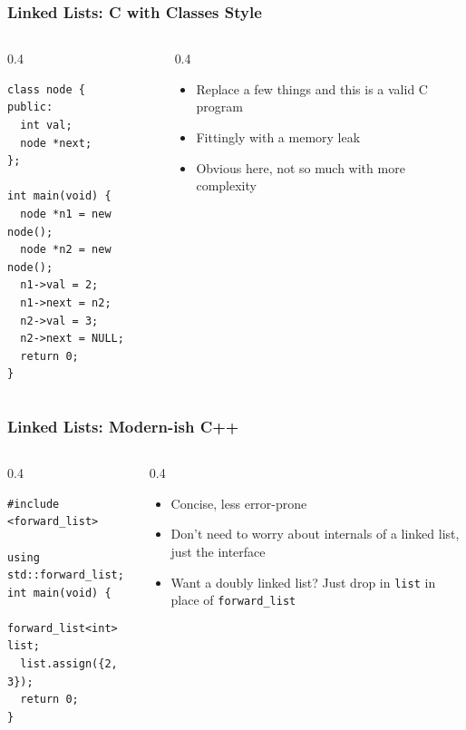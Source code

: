\documentclass{beamer} \usetheme{Madrid}
\begin{document}
\begin{frame}[fragile]
	\frametitle{Linked Lists: C with Classes Style}
	\begin{columns}
		\begin{column}{{0.4\textwidth}}
			\begin{verbatim}
class node {
public:
  int val;
  node *next;
};

int main(void) {
  node *n1 = new node();
  node *n2 = new node();
  n1->val = 2;
  n1->next = n2;
  n2->val = 3;
  n2->next = NULL;
  return 0;
}
			\end{verbatim}
		\end{column}
		\begin{column}{{0.4\textwidth}}
			\begin{itemize}
				\item Replace a few things and this is a valid C program
				\item Fittingly with a memory leak
				\item Obvious here, not so much with more complexity
			\end{itemize}
		\end{column}
	\end{columns}
\end{frame}

\begin{frame}[fragile]
	\frametitle{Linked Lists: Modern-ish C++}
	\begin{columns}
		\begin{column}{{0.4\textwidth}}
			\begin{verbatim}
#include <forward_list>

using std::forward_list;
int main(void) {
  forward_list<int> list;
  list.assign({2, 3});
  return 0;
}
			\end{verbatim}
		\end{column}
		\begin{column}{{0.4\textwidth}}
			\begin{itemize}
				\item Concise, less error-prone
				\item Don't need to worry about internals of a linked list, just the interface
				\item Want a doubly linked list? Just drop in \texttt{list} in place of \texttt{forward\_list}
			\end{itemize}
		\end{column}
	\end{columns}
\end{frame}
\end{document}
